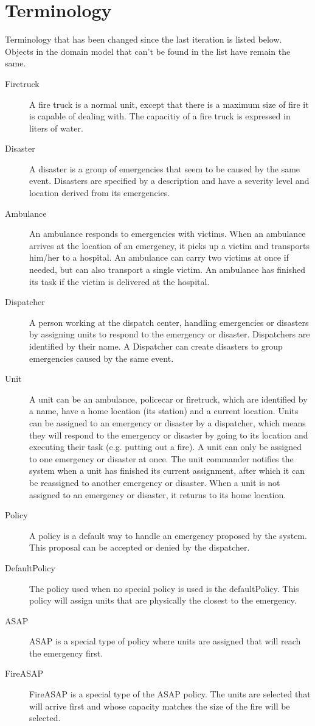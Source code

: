 \section{Terminology}
Terminology that has been changed since the last iteration is listed below. Objects in the domain model that can't be found in the list have remain the same.
\begin{description}
  \item[Firetruck] A fire truck is a normal unit, except that there is a maximum size of fire it is capable of dealing with. The capacitiy of a fire truck is expressed in liters of water.
  \item[Disaster] A disaster is a group of emergencies that seem to be caused by the same event. Disasters are specified by a description and have a severity level and location derived from its emergencies.
  \item[Ambulance] An ambulance responds to emergencies with victims. When an ambulance arrives at the location of an emergency, it picks up a victim and transports him/her to a hospital. An ambulance can carry two victims at once if needed, but can also transport a single victim. An ambulance has finished its task if the victim is delivered at the hospital. 
  \item[Dispatcher] A person working at the dispatch center, handling emergencies or disasters by assigning units to respond to the emergency or disaster. Dispatchers are identified by their name. A Dispatcher can create disasters to group emergencies caused by the same event.
  \item[Unit] A unit can be an ambulance, policecar or firetruck, which are identified by a name, have a home location (its station) and a current location. Units can be assigned to an emergency or disaster by a dispatcher, which means they will respond to the emergency or disaster by going to its location and executing their task (e.g. putting out a fire). A unit can only be assigned to one emergency or disaster at once. The unit commander notifies the system when a unit has finished its current assignment, after which it can be reassigned to another emergency or disaster. When a unit is not assigned to an emergency or disaster, it returns to its home location.
  \item[Policy] A policy is a default way to handle an emergency proposed by the system. This proposal can be accepted or denied by the dispatcher.
  \item[DefaultPolicy] The policy used when no special policy is used is the defaultPolicy. This policy will assign units that are physically the closest to the emergency.
  \item[ASAP] ASAP is a special type of policy where units are assigned that will reach the emergency first.
  \item[FireASAP] FireASAP is a special type of the ASAP policy. The units are selected that will arrive first and whose capacity matches the size of the fire will be selected.
\end{description}
